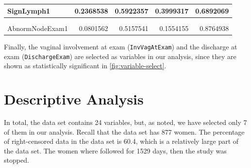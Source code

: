 \documentclass[
]{article}
\begin{document}
\begin{tabular}{l|r|r|r|r}
\hline
SignLymph1 & 0.2368538 & 0.5922357 & 0.3999317 & 0.6892069\\
\hline
\cellcolor{blue}{\textcolor{white}{InvVagAtExam1}} & \cellcolor{blue}{\textcolor{white}{0.5726933}} & \cellcolor{blue}{\textcolor{white}{0.2003764}} & \cellcolor{blue}{\textcolor{white}{2.8580874}} & \cellcolor{blue}{\textcolor{white}{0.0042620}}\\
\hline
\cellcolor{blue}{\textcolor{white}{DischargeExam1}} & \cellcolor{blue}{\textcolor{white}{-0.5805191}} & \cellcolor{blue}{\textcolor{white}{0.2691414}} & \cellcolor{blue}{\textcolor{white}{-2.1569301}} & \cellcolor{blue}{\textcolor{white}{0.0310111}}\\
\hline
AbnormNodeExam1 & 0.0801562 & 0.5157541 & 0.1554155 & 0.8764938\\
\hline
\end{tabular}

Finally, the vaginal involvement at exam (\texttt{InvVagAtExam}) and the discharge at exam (\texttt{DischargeExam}) are selected as variables in our analysis, since they are shown as statistically significant in \ref{fig:variable-select}.

\hypertarget{descriptive-analysis}{%
\section{Descriptive Analysis}\label{descriptive-analysis}}

In total, the data set contains 24 variables, but, as noted, we have selected only 7 of them in our analysis. Recall that the data set has 877 women. The percentage of right-censored data in the data set is 60.4, which is a relatively large part of the data set. The women where followed for 1529 days, then the study was stopped.
\end{document}
